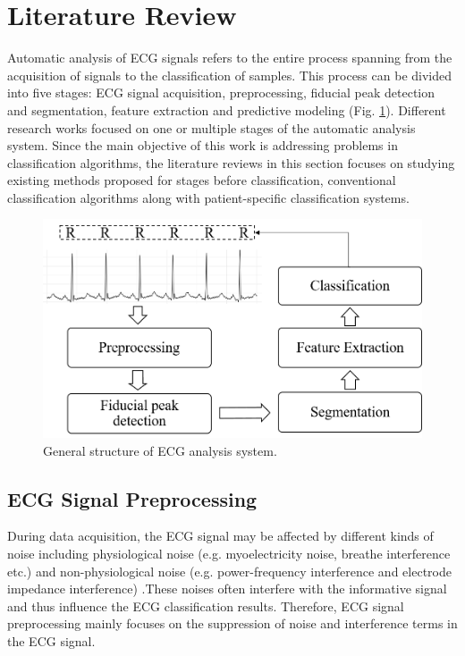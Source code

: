 \section{Literature Review}
Automatic analysis of ECG signals refers to the entire process spanning from the acquisition of signals to the classification of samples. This process can be divided into five stages: ECG signal acquisition, preprocessing, fiducial peak detection and segmentation, feature extraction and predictive modeling (Fig. \ref{fig:1-1}). Different research works focused on one or multiple stages of the automatic analysis system. Since the main objective of this work is addressing problems in classification algorithms, the literature reviews in this section focuses on studying existing methods proposed for stages before classification, conventional classification algorithms along with patient-specific classification systems. 

 \begin{figure}[thpb]
 	\centering
 	\includegraphics[scale=0.7]{Fig/general_flow.png}  
 	\caption{General structure of ECG analysis system.}
 	\label{fig:1-1}
 \end{figure}


\subsection{ECG Signal Preprocessing}

During data acquisition, the ECG signal may be affected by  different kinds of noise including physiological noise (e.g. myoelectricity noise, breathe interference etc.) and non-physiological noise (e.g. power-frequency interference and electrode impedance interference) \cite{denoise}.These noises often interfere with the informative signal and thus influence the ECG classification results. Therefore, ECG signal preprocessing mainly focuses on the suppression of noise and interference terms in the ECG signal.

